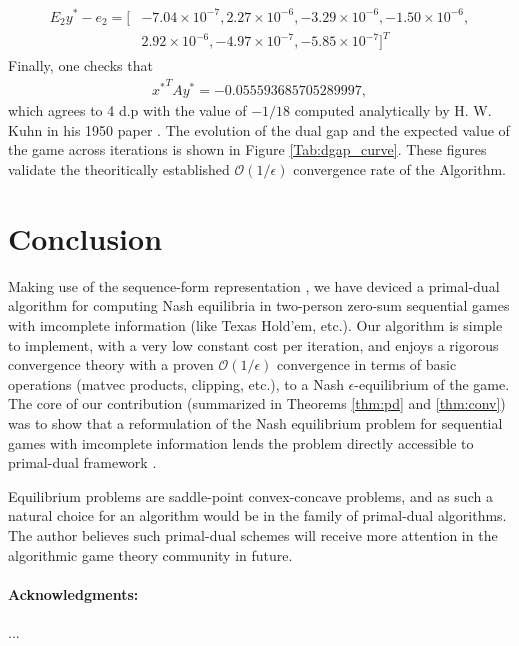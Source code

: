 \documentclass{article} %
\begin{document}
\begin{eqnarray*}
  \begin{split}
    E_2y^* - e_2 = [&-7.04 \times 10^{-7}, 2.27 \times 10^{-6}, -3.29
      \times 10^{-6}, -1.50 \times 10^{-6},\\
      &2.92 \times 10^{-6}, -4.97 \times 10^{-7}, -5.85 \times
      10^{-7}]^T
    \end{split}
\end{eqnarray*}
Finally, one checks that
\begin{eqnarray*}
  {x^*}^TAy^* = -0.055593685705289997,
\end{eqnarray*}
 which agrees to 4 d.p with the value of $-1 / 18$ computed
 analytically by H. W. Kuhn in his 1950 paper \cite{kuhn}. The
 evolution of the dual gap and the expected value of the game across
 iterations is shown in Figure \ref{Tab:dgap_curve}. These figures
 validate the theoritically established $\mathcal{O}(1/\epsilon)$
 convergence rate of the Algorithm.


\section{Conclusion}
Making use of the sequence-form representation
\cite{koller1992complexity,von1996efficient,vonequilibrium}, we have
deviced a primal-dual algorithm for computing Nash equilibria in
two-person zero-sum sequential games with imcomplete information (like
Texas Hold'em, etc.). Our algorithm is simple to implement, with a
very low constant cost per iteration, and enjoys a rigorous
convergence theory with a proven $\mathcal{O}(1/\epsilon)$ convergence
in terms of basic operations (matvec products, clipping, etc.), to a
Nash $\epsilon$-equilibrium of the game. The core of our contribution
(summarized in Theorems \ref{thm:pd} and \ref{thm:conv}) was to show
that a reformulation of the Nash equilibrium problem for sequential
games with imcomplete information lends the problem directly
accessible to primal-dual framework
\cite{chambolle2010,chambolle2014ergodic}.

Equilibrium problems are saddle-point convex-concave problems, and as
such a natural choice for an algorithm would be in the family of
primal-dual algorithms. The author believes such primal-dual schemes
will receive more attention in the algorithmic game theory community
in future.


\medskip \noindent

\paragraph{Acknowledgments:} ...
\small


\end{document}
